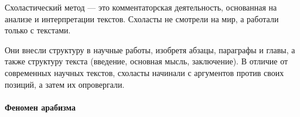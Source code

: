 
Схоластический метод --- это комментаторская деятельность, основанная на анализе и интерпретации текстов. Схоласты не смотрели на мир, а работали только с текстами. 

Они внесли структуру в научные работы, изобретя абзацы, параграфы и главы, а также структуру текста (введение, основная мысль, заключение). В отличие от современных научных текстов, схоласты начинали с аргументов против своих позиций, а затем их опровергали.


\paragraph{Феномен арабизма}

